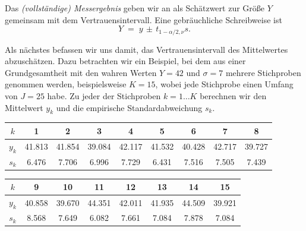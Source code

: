Das \textsl{(vollständige) Messergebnis} geben wir an als
Schätzwert zur Größe $Y$ gemeinsam mit dem Vertrauensintervall.
Eine gebräuchliche Schreibweise ist
\begin{equation}
Y \; = \; y \, \pm \, t_{1-\alpha/2,\nu} s .
\label{vollstaendigesErgebKlassisch}
\end{equation}

Als nächstes befassen wir uns damit, das Vertrauensintervall des Mittelwertes abzuschätzen.
Dazu betrachten wir ein Beispiel, bei dem aus einer Grundgesamtheit mit den wahren
Werten $Y = 42$ und $\sigma = 7$ mehrere Stichproben genommen werden, beispielsweise $K = 15$,
wobei jede Stichprobe einen Umfang von $J = 25$ habe. Zu jeder der Stichproben $k = 1\dots K$
berechnen wir den Mittelwert $y_k$ und die empirische Standardabweichung $s_k$.

\begin{tabular}{c||c|c|c|c|c|c|c|c}
$k$   &  1     &    2   &    3   &   4    &    5   &   6    &   7    &   8   \\
\hline\hline
$y_k$ & 41.813 & 41.854 & 39.084 & 42.117 & 41.532 & 40.428 & 42.717 & 39.727\\
\hline
$s_k$ &  6.476 &  7.706 &  6.996 &  7.729 &  6.431 &  7.516 &  7.505 &  7.439\\
\end{tabular}

\vspace{3mm}

\begin{tabular}{c||c|c|c|c|c|c|c}
$k$   &  9     &    10  &   11   &   12   &   13   &   14   &   15  \\
\hline\hline
$y_k$ & 40.858 & 39.670 & 44.351 & 42.011 & 41.935 & 44.509 & 39.921\\
\hline
$s_k$ &  8.568 &  7.649 &  6.082 &  7.661 &  7.084 &  7.878 &  7.084\\
\end{tabular}

